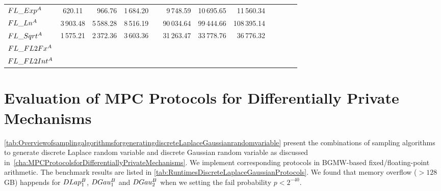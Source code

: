 \begin{table}
{\begin{tabular}{ l c r r r r r r r r r r}
            $FL\_Exp^{A}$                         & 620.11                  & 966.76    & 1\,684.20               &   & 9\,748.59  & 10\,695.65 & 11\,560.34  \\
            $FL\_Ln^{A}$                          & 3\,903.48               & 5\,588.28 & 8\,516.19               &   & 90\,034.64 & 99\,444.66 & 108\,395.14 \\
            $FL\_Sqrt^{A}$                        & 1\,575.21               & 2\,372.36 & 3\,603.36               &   & 31\,263.47 & 33\,778.76 & 36\,776.32  \\
            $FL\_FL2Fx^{A}$                       &                         &           &                         &   &            &            &             \\
            $FL\_FL2Int^{A}$                      &                         &           &                         &   &            &            &             \\
            \bottomrule
        \end{tabular}
    }
\end{table}
\FloatBarrier


\section{Evaluation of MPC Protocols for Differentially Private Mechanisms}
\label{sec:EvaluationofMPCProtocolsforDifferentiallyPrivateMechanisms}

\autoref{tab:OverviewofsamplingalgorithmsforgeneratingdiscreteLaplaceGaussianrandomvariable} present the combinations of sampling algorithms to generate discrete Laplace random variable and discrete Gaussian random variable as discussed in~\autoref{cha:MPCProtocolsforDifferentiallyPrivateMechanisms}. We implement corresponding protocols in BGMW-based fixed/floating-point arithmetic.
The benchmark results are listed in \autoref{tab:RuntimesDiscreteLaplaceGaussianProtocols}.
We found that memory overflow ($>128$ GB) happends for $DLap_1^{B}$, $DGau_1^{B}$ and $DGau_2^{B}$ when we setting the fail probability $p<2^{-40}$.


